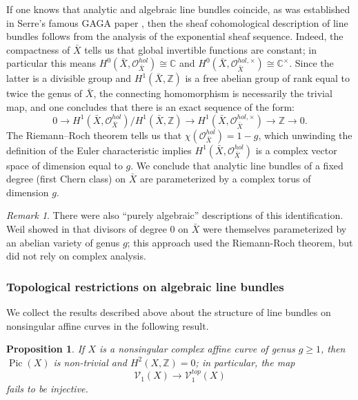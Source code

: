 \documentclass[11pt,leqno]{article}
\newcommand{\cplx}{{\mathbb C}}
\newcommand{\Z}{{\mathbb Z}}
\renewcommand{\1}{{\rm 1\hspace*{-0.4ex}%
\rule{0.1ex}{1.52ex}\hspace*{0.2ex}}}
\newcommand{\Pic}{\operatorname{Pic}}
\newcommand{\<}[1]{{\langle}#1 {\rangle}}
\theoremstyle{plain}
\newtheorem{proposition}[theorem]{Proposition}
\theoremstyle{definition}
\theoremstyle{remark}
\newtheorem{rem}[theorem]{Remark}
\numberwithin{equation}{subsection}
\begin{document}
If one knows that analytic and algebraic line bundles coincide, as was established in Serre's famous GAGA paper \cite{SerreGAGA}, then the sheaf cohomological description of line bundles follows from the analysis of the exponential sheaf sequence.  Indeed, the compactness of $\bar{X}$ tells us that global invertible functions are constant; in particular this means $H^0(\bar{X},\mathscr{O}_{\bar{X}}^{hol}) \cong \cplx$ and $H^0(\bar{X},\mathscr{O}_{\bar{X}}^{hol,\times}) \cong \cplx^{\times}$.  Since the latter is a divisible group and $H^1(\bar{X},\Z)$ is a free abelian group of rank equal to twice the genus of $\bar{X}$, the connecting homomorphism is necessarily the trivial map, and one concludes that there is an exact sequence of the form: 
\[
0 \longrightarrow H^1(\bar{X},\mathscr{O}_{\bar{X}}^{hol})/H^1(\bar{X},\Z) \longrightarrow H^1(\bar{X},\mathscr{O}_{\bar{X}}^{hol,\times}) \longrightarrow \Z \longrightarrow 0.
\]
The Riemann--Roch theorem tells us that $\chi(\mathscr{O}_{\bar{X}}^{hol}) = 1-g$, which unwinding the definition of the Euler characteristic implies $H^1(\bar{X},\mathscr{O}_{\bar{X}}^{hol})$ is a complex vector space of dimension equal to $g$.  We conclude that analytic line bundles of a fixed degree (first Chern class) on $\bar{X}$ are parameterized by a complex torus of dimension $g$.

\begin{rem}
There were also ``purely algebraic'' descriptions of this identification. Weil showed in \cite{Weil1948} that divisors of degree $0$ on $\bar{X}$ were themselves parameterized by an abelian variety of genus $g$; this approach used the Riemann-Roch theorem, but did not rely on complex analysis.
\end{rem}


\subsubsection*{Topological restrictions on algebraic line bundles}
We collect the results described above about the structure of line bundles on nonsingular affine curves in the following result.

\begin{proposition}
	If $X$ is a nonsingular complex affine curve of genus $g \geq 1$, then $\Pic(X)$ is non-trivial and $H^2(X,\Z) = 0$; in particular, the map 
	\[
	\mathscr{V}_1(X) \longrightarrow \mathscr{V}_1^{top}(X)
	\]
	fails to be injective. 
\end{proposition}
\end{document}
